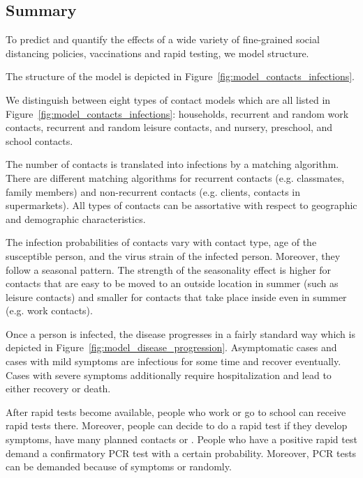 \subsection{Summary}
\label{sub:model_summary}

To predict and quantify the effects of a wide variety of fine-grained social distancing
policies, vaccinations and rapid testing, we  model structure. 

The structure of the model is depicted in Figure~\ref{fig:model_contacts_infections}.

We distinguish between eight types of contact
models which are all listed in Figure~\ref{fig:model_contacts_infections}: households,
recurrent and random work contacts, recurrent and random leisure contacts, and nursery,
preschool, and school contacts.

The number of contacts is translated into infections by a matching algorithm.
There are different matching algorithms for recurrent contacts (e.g. classmates, family
members) and non-recurrent contacts (e.g. clients, contacts in supermarkets).
All types of contacts can be assortative with respect to geographic and demographic
characteristics.

The infection probabilities of contacts vary with contact type, age of the susceptible
person, and the virus strain of the infected person. Moreover, they follow a seasonal
pattern. The strength of the seasonality effect is higher for contacts that are easy to
be moved to an outside location in summer (such as leisure contacts) and smaller for
contacts that take place inside even in summer (e.g. work contacts).

Once a person is infected, the disease progresses in a fairly standard way which is
depicted in Figure~\ref{fig:model_disease_progression}. Asymptomatic cases and cases with
mild symptoms are infectious for some time and recover eventually. Cases with severe
symptoms additionally require hospitalization and lead to either recovery or death.

After rapid tests become available, people who work or go to school can receive rapid
tests there. Moreover, people can decide to do a rapid test if they develop symptoms,
have many planned contacts or
. People who have a positive rapid test demand a confirmatory PCR test
with a certain probability. Moreover, PCR tests can be demanded because of symptoms or
randomly.

